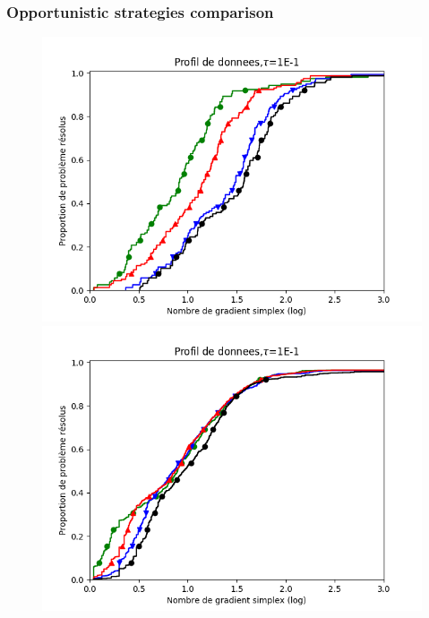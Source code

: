 \documentclass[11pt,utf8,compress]{beamer}
\begin{document}
\begin{frame}
\frametitle{Opportunistic strategies comparison}
\noindent
\begin{center}
	\begin{figure}
		\vspace{-1em}
		\begin{minipage}[t]{0.45\linewidth}
			\includegraphics[width=\linewidth]{coppcomp.png}
		\end{minipage}
		\hfill%
		\begin{minipage}[t]{0.45\linewidth}
			\includegraphics[width=\linewidth]{moppcomp.png}
		\end{minipage}

\end{figure}
\end{center}
\end{frame}
\end{document}
